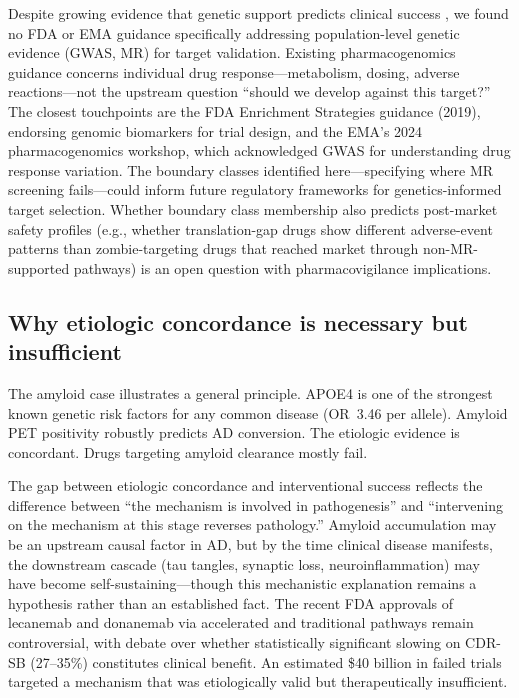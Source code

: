 \documentclass[11pt]{article}
\begin{document}
Despite growing evidence that genetic support predicts clinical success \cite{nelson2015,minikel2024}, we found no FDA or EMA guidance specifically addressing population-level genetic evidence (GWAS, MR) for target validation. Existing pharmacogenomics guidance concerns individual drug response---metabolism, dosing, adverse reactions---not the upstream question ``should we develop against this target?'' The closest touchpoints are the FDA Enrichment Strategies guidance (2019), endorsing genomic biomarkers for trial design, and the EMA's 2024 pharmacogenomics workshop, which acknowledged GWAS for understanding drug response variation. The boundary classes identified here---specifying where MR screening fails---could inform future regulatory frameworks for genetics-informed target selection. Whether boundary class membership also predicts post-market safety profiles (e.g., whether translation-gap drugs show different adverse-event patterns than zombie-targeting drugs that reached market through non-MR-supported pathways) is an open question with pharmacovigilance implications.

\subsection{Why etiologic concordance is necessary but insufficient}

The amyloid case illustrates a general principle. APOE4 is one of the strongest known genetic risk factors for any common disease (OR~3.46 per allele). Amyloid PET positivity robustly predicts AD conversion. The etiologic evidence is concordant. Drugs targeting amyloid clearance mostly fail.

The gap between etiologic concordance and interventional success reflects the difference between ``the mechanism is involved in pathogenesis'' and ``intervening on the mechanism at this stage reverses pathology.'' Amyloid accumulation may be an upstream causal factor in AD, but by the time clinical disease manifests, the downstream cascade (tau tangles, synaptic loss, neuroinflammation) may have become self-sustaining---though this mechanistic explanation remains a hypothesis rather than an established fact. The recent FDA approvals of lecanemab and donanemab via accelerated and traditional pathways remain controversial, with debate over whether statistically significant slowing on CDR-SB (27--35\%) constitutes clinical benefit. An estimated \$40 billion in failed trials \cite{cummings_zhong2014} targeted a mechanism that was etiologically valid but therapeutically insufficient.
\end{document}
